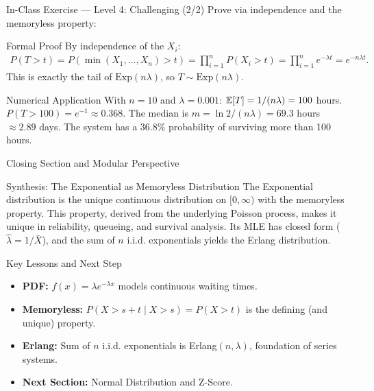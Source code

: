 \documentclass[aspectratio=169,xcolor={dvipsnames,table}]{beamer}
\begin{document}
\begin{frame}{In-Class Exercise --- Level 4: Challenging (2/2)}
	\vspace{-0.05cm}
	\scriptsize
	Prove via independence and the memoryless property: \pause
	\begin{block}{Formal Proof}
		\scriptsize
		By independence of the $X_{i}$:
		\begin{align*}
			P(T > t) = P(\min(X_{1}, \dots, X_{n}) > t) = \prod_{i=1}^{n} P(X_{i} > t) = \prod_{i=1}^{n} e^{-\lambda t} = e^{-n\lambda t}.
		\end{align*}
		This is exactly the tail of $\text{Exp}(n\lambda)$, so $T \sim \text{Exp}(n\lambda)$. \quad \qedhere
	\end{block}
	\vspace{0.05cm}
	\pause
	\begin{alertblock}{Numerical Application}
		\scriptsize
		With $n = 10$ and $\lambda = 0.001$: $\mathbb{E}[T] = 1/(n\lambda) = 100$ hours. $P(T > 100) = e^{-1} \approx 0.368$. The median is $m = \ln 2/(n\lambda) = 69.3$ hours $\approx 2.89$ days. The system has a 36.8\% probability of surviving more than 100 hours.
	\end{alertblock}
\end{frame}

\begin{frame}{Closing Section and Modular Perspective}
	\vspace{-0.2cm}
	\begin{block}{Synthesis: The Exponential as Memoryless Distribution}
		\scriptsize
		The Exponential distribution is the unique continuous distribution on $[0, \infty)$ with the memoryless property. This property, derived from the underlying Poisson process, makes it unique in reliability, queueing, and survival analysis. Its MLE has closed form ($\hat{\lambda} = 1/\bar{X}$), and the sum of $n$ i.i.d. exponentials yields the Erlang distribution.
	\end{block}
	\vspace{0.05cm}
	\pause
	\begin{alertblock}{Key Lessons and Next Step}
		\begin{itemize}\itemsep=0.05cm
			\item \textbf{PDF:} $f(x) = \lambda e^{-\lambda x}$ models continuous waiting times.
			\item \textbf{Memoryless:} $P(X > s + t \mid X > s) = P(X > t)$ is the defining (and unique) property.
			\item \textbf{Erlang:} Sum of $n$ i.i.d. exponentials is Erlang$(n, \lambda)$, foundation of series systems.
			\item \textbf{Next Section:} \textcolor{TecRojo}{Normal Distribution and Z-Score}.
		\end{itemize}
	\end{alertblock}
\end{frame}
\end{document}
